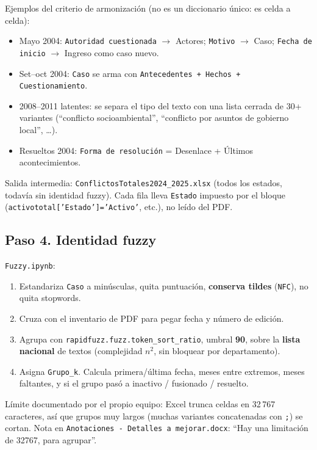 \documentclass[11pt,a4paper]{article}
\begin{document}
Ejemplos del criterio de armonización (no es un diccionario único: es celda a celda):

\begin{itemize}
  \item Mayo 2004: \texttt{Autoridad cuestionada} $\to$ Actores; \texttt{Motivo} $\to$ Caso; \texttt{Fecha de inicio} $\to$ Ingreso como caso nuevo.
  \item Set--oct 2004: \texttt{Caso} se arma con \texttt{Antecedentes + Hechos + Cuestionamiento}.
  \item 2008--2011 latentes: se separa el tipo del texto con una lista cerrada de 30+ variantes (``conflicto socioambiental'', ``conflicto por asuntos de gobierno local'', \ldots).
  \item Resueltos 2004: \texttt{Forma de resolución} = Desenlace + Últimos acontecimientos.
\end{itemize}

Salida intermedia: \texttt{ConflictosTotales2024\_2025.xlsx} (todos los estados, todavía sin identidad fuzzy). Cada fila lleva \texttt{Estado} impuesto por el bloque (\texttt{activototal['Estado']='Activo'}, etc.), no leído del PDF.

\subsection{Paso 4. Identidad fuzzy}

\texttt{Fuzzy.ipynb}:

\begin{enumerate}
  \item Estandariza \texttt{Caso} a minúsculas, quita puntuación, \textbf{conserva tildes} (\texttt{NFC}), no quita stopwords.
  \item Cruza con el inventario de PDF para pegar fecha y número de edición.
  \item Agrupa con \texttt{rapidfuzz.fuzz.token\_sort\_ratio}, umbral \textbf{90}, sobre la \textbf{lista nacional} de textos (complejidad $n^2$, sin bloquear por departamento).
  \item Asigna \texttt{Grupo\_k}. Calcula primera/última fecha, meses entre extremos, meses faltantes, y si el grupo pasó a inactivo / fusionado / resuelto.
\end{enumerate}

Límite documentado por el propio equipo: Excel trunca celdas en 32\,767 caracteres, así que grupos muy largos (muchas variantes concatenadas con \texttt{;}) se cortan. Nota en \texttt{Anotaciones - Detalles a mejorar.docx}: ``Hay una limitación de 32767, para agrupar''.
\end{document}
